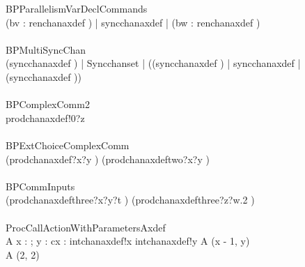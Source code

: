 \begin{circus}


 \circprocess BPParallelismVarDeclCommands \circdef \circbegin \\
    \circspot (\circvar bv : \nat \circspot renchanaxdef \then \Skip) \lpar | \lchanset syncchanaxdef \rchanset | \rpar (\circvar bw : \nat \circspot renchanaxdef \then \Skip) \\
 \circend \\

 \circprocess BPMultiSyncChan \circdef \circbegin \\
    \circspot (syncchanaxdef \then \Skip) \lpar | 
    Syncchanset
    | \rpar ((syncchanaxdef \then \Skip) \lpar | \lchanset syncchanaxdef \rchanset | \rpar (syncchanaxdef \then \Skip)) \\
 \circend \\

 \circprocess BPComplexComm2 \circdef \circbegin \\
    \circspot prodchanaxdef!0?z \then \Skip \\
\circend \\
 
 \circprocess BPExtChoiceComplexComm \circdef \circbegin \\
    \circspot (prodchanaxdef?x?y \then \Skip) \extchoice (prodchanaxdeftwo?x?y \then \Skip) \\
\circend \\

 \circprocess BPCommInputs \circdef \circbegin \\
   \circspot (prodchanaxdefthree?x?y?t \then \Skip) \extchoice (prodchanaxdefthree?z?w.2 \then \Skip) \\
 \circend \\

 \circprocess ProcCallActionWithParametersAxdef \circdef \circbegin \\
    A \circdef x : \nat ; y : \nat \circspot \circvar cx : \nat \circspot intchanaxdef!x \then intchanaxdef!y \then A (x - 1, y) \\
    \circspot A (2, 2) \\
 \circend \\
 

\end{circus}
